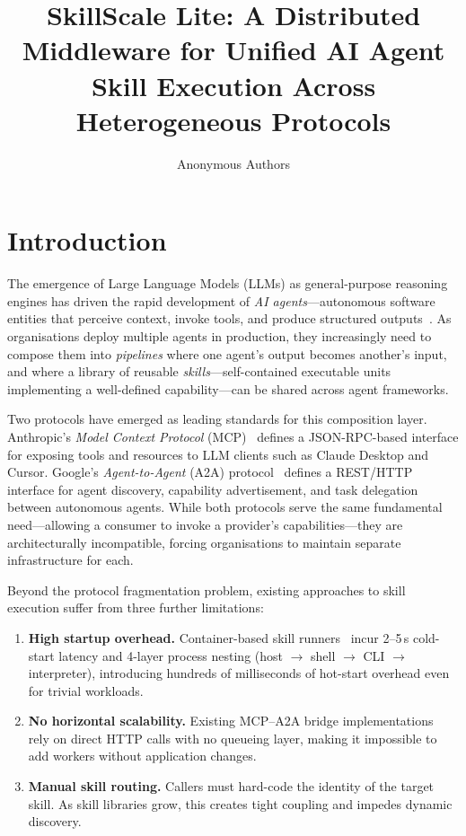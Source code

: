 \documentclass[sigconf,nonacm]{acmart}
\title{SkillScale Lite: A Distributed Middleware for Unified AI Agent Skill Execution Across Heterogeneous Protocols}
\author{Anonymous Authors}
\affiliation{%
  \institution{Anonymized for Double-Blind Review}
  \country{Anonymous}
}
\begin{document}
\maketitle

\section{Introduction}
\label{sec:intro}

The emergence of Large Language Models (LLMs) as general-purpose reasoning engines has driven the rapid development of \emph{AI agents}---autonomous software entities that perceive context, invoke tools, and produce structured outputs~\cite{openai2020,autogen2023}. As organisations deploy multiple agents in production, they increasingly need to compose them into \emph{pipelines} where one agent's output becomes another's input, and where a library of reusable \emph{skills}---self-contained executable units implementing a well-defined capability---can be shared across agent frameworks.

Two protocols have emerged as leading standards for this composition layer. Anthropic's \emph{Model Context Protocol} (MCP)~\cite{mcp2024} defines a JSON-RPC-based interface for exposing tools and resources to LLM clients such as Claude Desktop and Cursor. Google's \emph{Agent-to-Agent} (A2A) protocol~\cite{a2a2025} defines a REST/HTTP interface for agent discovery, capability advertisement, and task delegation between autonomous agents. While both protocols serve the same fundamental need---allowing a consumer to invoke a provider's capabilities---they are architecturally incompatible, forcing organisations to maintain separate infrastructure for each.

Beyond the protocol fragmentation problem, existing approaches to skill execution suffer from three further limitations:

\begin{enumerate}
  \item \textbf{High startup overhead.} Container-based skill runners~\cite{docker2014} incur 2--5\,s cold-start latency and 4-layer process nesting (host $\rightarrow$ shell $\rightarrow$ CLI $\rightarrow$ interpreter), introducing hundreds of milliseconds of hot-start overhead even for trivial workloads.
  \item \textbf{No horizontal scalability.} Existing MCP--A2A bridge implementations~\cite{a2amcpserver2024,a2agateway2024,peerclaw2024} rely on direct HTTP calls with no queueing layer, making it impossible to add workers without application changes.
  \item \textbf{Manual skill routing.} Callers must hard-code the identity of the target skill. As skill libraries grow, this creates tight coupling and impedes dynamic discovery.
\end{enumerate}
\end{document}
